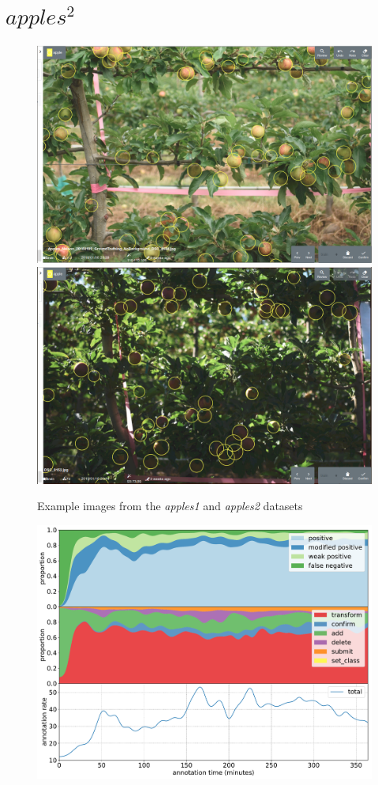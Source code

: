 \pagebreak
\section{$apples^2$}


\begin{figure}[!h]
  \includegraphics[width=0.475\linewidth]{figures/annotation/screenshots/apples2.png}
  \hfill
  \includegraphics[width=0.475\linewidth]{figures/annotation/screenshots/apples2_dark.png}
\caption{Example images from the \emph{apples1} and \emph{apples2} datasets}
\label{fig:apples2_dataset}  
\end{figure}

\begin{figure}[!h]
\centering
\includegraphics[width=1.0\linewidth]{charts/action_annotations/apples2.pdf}
\caption{  }
\label{fig:apples2_annotation}
\end{figure}


